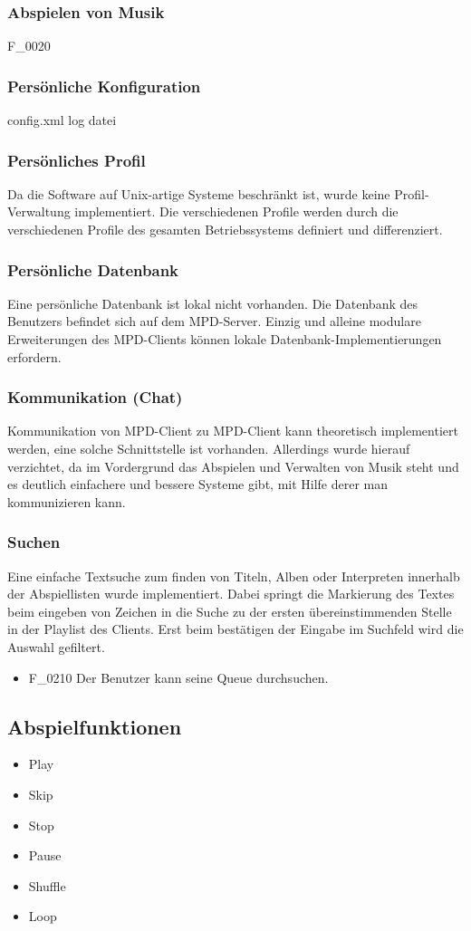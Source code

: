 \subsubsection{Abspielen von Musik}
	\item F\_0020 
\subsubsection{Persönliche Konfiguration}
config.xml
log datei
\subsubsection{Persönliches Profil}
Da die Software auf Unix-artige Systeme beschränkt ist, wurde keine Profil-Verwaltung implementiert. Die
verschiedenen Profile werden durch die verschiedenen Profile des gesamten Betriebssystems definiert und differenziert.
\subsubsection{Persönliche Datenbank}
Eine persönliche Datenbank ist lokal nicht vorhanden. Die Datenbank des Benutzers befindet sich auf dem MPD-Server.
Einzig und alleine modulare Erweiterungen des MPD-Clients können lokale Datenbank-Implementierungen erfordern.
\subsubsection{Kommunikation (Chat)}
Kommunikation von MPD-Client zu MPD-Client kann theoretisch implementiert werden, eine solche Schnittstelle ist vorhanden.
Allerdings wurde hierauf verzichtet, da im Vordergrund das Abspielen und Verwalten von Musik steht und es deutlich
einfachere und bessere Systeme gibt, mit Hilfe derer man kommunizieren kann.
\subsubsection{Suchen}
Eine einfache Textsuche zum finden von Titeln, Alben oder Interpreten innerhalb der Abspiellisten wurde implementiert.
Dabei springt die Markierung des Textes beim eingeben von Zeichen in die Suche zu der ersten übereinstimmenden
Stelle in der Playlist des Clients. Erst beim bestätigen der Eingabe im Suchfeld wird die Auswahl gefiltert.
\begin{itemize}
        \item F\_0210 Der Benutzer kann seine Queue durchsuchen.
\end{itemize}
\subsection{Abspielfunktionen}
\begin{itemize}
	\item Play
	\item Skip
	\item Stop
	\item Pause
	\item Shuffle
	\item Loop
\end{itemize}
